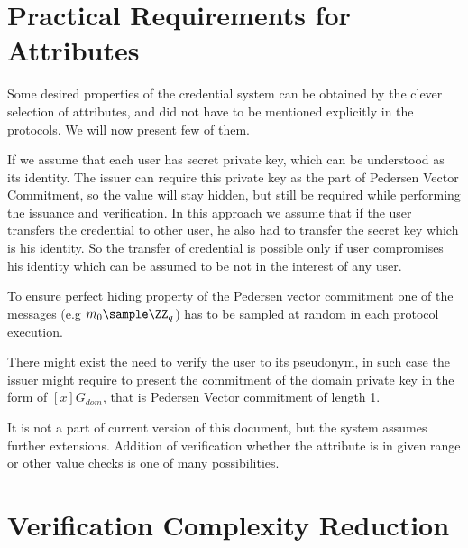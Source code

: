 \section{Practical Requirements for Attributes}

Some desired properties of the credential system can be obtained by the clever selection of attributes, and did not have to be mentioned explicitly in the protocols. We will now present few of them.

\begin{requirement}
If we assume that each user has secret private key, which can be understood as its identity. The issuer can require this private key as the part of Pedersen Vector Commitment, so the value will stay hidden, but still be required while performing the issuance and verification. In this approach we assume that if the user transfers the credential to other user, he also had to transfer the secret key which is his identity. So the transfer of credential is possible only if user compromises his identity which can be assumed to be not in the interest of any user.
\end{requirement}

\begin{requirement}
To ensure perfect hiding property of the Pedersen vector commitment one of the messages (e.g $m_0 \sample \ZZ_q$) has to be sampled at random in each protocol execution. 
\end{requirement}

\begin{requirement}
There might exist the need to verify the user to its pseudonym, in such case the issuer might require to present the commitment of the domain private key in the form of $[x]G_{\textit{dom}}$, that is Pedersen Vector commitment of length 1. 
\end{requirement}

\begin{requirement}
It is not a part of current version of this document, but the system assumes further extensions. Addition of verification whether the attribute is in given range or other value checks is one of many possibilities.
\end{requirement}

\section{Verification Complexity Reduction}


